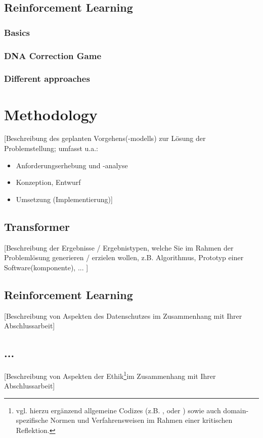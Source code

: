 \documentclass[oneside,bibliography=totocnumbered,BCOR=5mm]{scrbook}%
\theoremstyle{definition}
\theoremstyle{definition}
\theoremstyle{definition}
\theoremstyle{definition}
\theoremstyle{definition}
\theoremstyle{definition}
\begin{document}
\section{Reinforcement Learning}


\subsection{Basics}


\subsection{DNA Correction Game}

\subsection{Different approaches}

\chapter{Methodology}

[Beschreibung des geplanten Vorgehens(-modells) zur L\"osung der Problemstellung; umfasst u.a.:
\begin{itemize}
\item Anforderungserhebung und -analyse
\item Konzeption, Entwurf
\item Umsetzung (Implementierung)]
\end{itemize}

\section{Transformer}
[Beschreibung der Ergebnisse / Ergebnistypen, welche Sie im Rahmen der Probleml\"osung generieren / erzielen wollen, z.B. Algorithmus, Prototyp einer Software(komponente), ... ]

\section{Reinforcement Learning}
[Beschreibung von Aspekten des Datenschutzes im Zusammenhang mit Ihrer Abschlussarbeit]

\section{...}
[Beschreibung von Aspekten der Ethik\footnote{vgl. hierzu erg\"anzend allgemeine Codizes (z.B. \autocite{acm}, \autocite{ieee} oder \autocite{gi}) sowie auch domain-spezifische Normen und Verfahrensweisen im Rahmen einer kritischen Reflektion.}im Zusammenhang mit Ihrer Abschlussarbeit]
\end{document}
